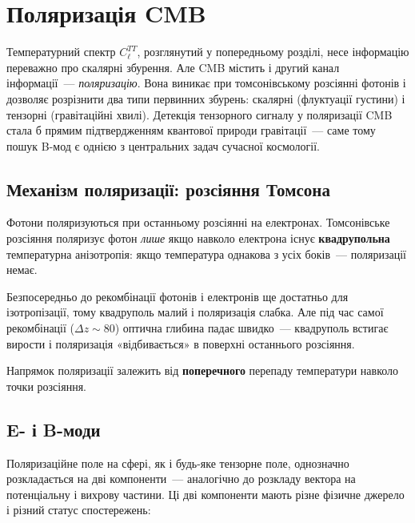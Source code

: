 \chapter{Поляризація CMB}
\label{sec:pol}

Температурний спектр $C_\ell^{TT}$, розглянутий у попередньому
розділі, несе інформацію переважно про скалярні збурення.
Але CMB містить і другий канал інформації~--- \emph{поляризацію}.
Вона виникає при томсонівському розсіянні фотонів і дозволяє
розрізнити два типи первинних збурень: скалярні (флуктуації
густини) і тензорні (гравітаційні хвилі). Детекція тензорного
сигналу у поляризації CMB стала б прямим підтвердженням
квантової природи гравітації~--- саме тому пошук B-мод є
однією з центральних задач сучасної космології.

\section{Механізм поляризації: розсіяння Томсона}

Фотони поляризуються при останньому розсіянні на електронах.
Томсонівське розсіяння поляризує фотон \emph{лише} якщо навколо електрона
існує \textbf{квадрупольна} температурна анізотропія: якщо температура
однакова з усіх боків~--- поляризації немає.

Безпосередньо до рекомбінації фотонів і електронів ще достатньо для
ізотропізації, тому квадруполь малий і поляризація слабка.
Але під час самої рекомбінації ($\Delta z \sim 80$) оптична глибина
падає швидко~--- квадруполь встигає вирости і поляризація «відбивається»
в поверхні останнього розсіяння.

Напрямок поляризації залежить від \textbf{поперечного} перепаду температури
навколо точки розсіяння.

\section{E- і B-моди}

Поляризаційне поле на сфері, як і будь-яке тензорне поле,
однозначно розкладається на дві компоненти~--- аналогічно
до розкладу вектора на потенціальну і вихрову частини.
Ці дві компоненти мають різне фізичне джерело і різний
статус спостережень:

